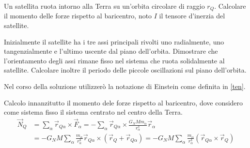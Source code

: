 \documentclass[../main.tex]{subfiles}
\begin{document}
\label{ex:crc}

\textex
Un satellita ruota intorno alla Terra su un'orbita circolare di raggio $r_Q$. Calcolare il momento delle forze rispetto al baricentro, noto $I$ il tensore d'inerzia del satellite. 

Inizialmente il satellite ha i tre assi principali rivolti uno radialmente, uno tangenzialmente e l'ultimo uscente dal piano dell'orbita. Dimostrare che l'orientamento degli assi rimane fisso nel sistema che ruota solidalmente al satellite. Calcolare inoltre il periodo delle piccole oscillazioni sul piano dell'orbita.

\solution
Nel corso della soluzione utilizzerò la notazione di Einstein come definita in \cref{ten}.

Calcolo innanzitutto il momento dele forze rispetto al baricentro, dove considero come sistema fisso il sistema centrato nel centro della Terra.
\begin{equation}\label{crc:MomentoForze1}
\begin{split}
	\vec N_Q	&= \sum_\alpha\vec r_{Q\alpha} \times \vec F_\alpha=- \sum_\alpha \vec r_{Q\alpha} \times \frac {G_N M m_\alpha }{r_\alpha^3}\vec r_\alpha \\
			&= -G_NM \sum_\alpha \frac {m_\alpha}{r_\alpha^3}\vec r_{Q\alpha} \times (\vec r_Q+\vec r_{Q\alpha})=-G_NM \sum_\alpha \frac {m_\alpha}{r_\alpha^3}(\vec r_{Q\alpha} \times \vec r_Q)
\end{split}
\end{equation}
\end{document}
